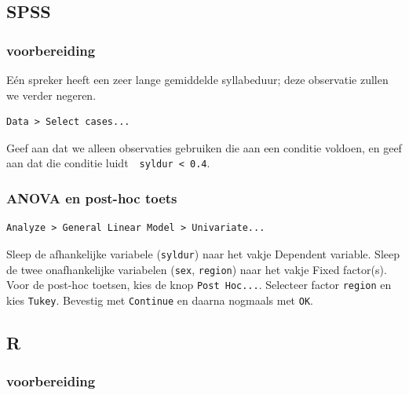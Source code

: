 \documentclass[
]{book}
\newenvironment{Shaded}{\begin{snugshade}}{\end{snugshade}}
\newcommand{\CommentTok}[1]{\textcolor[rgb]{0.56,0.35,0.01}{\textit{#1}}}
\newcommand{\FloatTok}[1]{\textcolor[rgb]{0.00,0.00,0.81}{#1}}
\newcommand{\KeywordTok}[1]{\textcolor[rgb]{0.13,0.29,0.53}{\textbf{#1}}}
\newcommand{\NormalTok}[1]{#1}
\newcommand{\OperatorTok}[1]{\textcolor[rgb]{0.81,0.36,0.00}{\textbf{#1}}}
\newcommand{\StringTok}[1]{\textcolor[rgb]{0.31,0.60,0.02}{#1}}
\begin{document}
\hypertarget{spss-13}{%
\subsection{SPSS}\label{spss-13}}

\hypertarget{voorbereiding-2}{%
\subsubsection{voorbereiding}\label{voorbereiding-2}}

Eén spreker heeft een zeer lange gemiddelde syllabeduur; deze observatie
zullen we verder negeren.

\begin{verbatim}
Data > Select cases...
\end{verbatim}

Geef aan dat we alleen observaties gebruiken die aan een conditie
voldoen, en geef aan dat die conditie luidt~~\texttt{syldur\ \textless{}\ 0.4}.

\hypertarget{anova-en-post-hoc-toets}{%
\subsubsection{ANOVA en post-hoc toets}\label{anova-en-post-hoc-toets}}

\begin{verbatim}
Analyze > General Linear Model > Univariate...
\end{verbatim}

Sleep de afhankelijke variabele (\texttt{syldur}) naar het vakje Dependent
variable. Sleep de twee onafhankelijke variabelen (\texttt{sex}, \texttt{region}) naar het
vakje Fixed factor(s).\\
Voor de post-hoc toetsen, kies de knop \texttt{Post\ Hoc...}. Selecteer factor
\texttt{region} en kies \texttt{Tukey}. Bevestig met \texttt{Continue} en daarna nogmaals met
\texttt{OK}.

\hypertarget{r-15}{%
\subsection{R}\label{r-15}}

\hypertarget{voorbereiding-3}{%
\subsubsection{voorbereiding}\label{voorbereiding-3}}

\begin{Shaded}
\end{Shaded}
\end{document}
